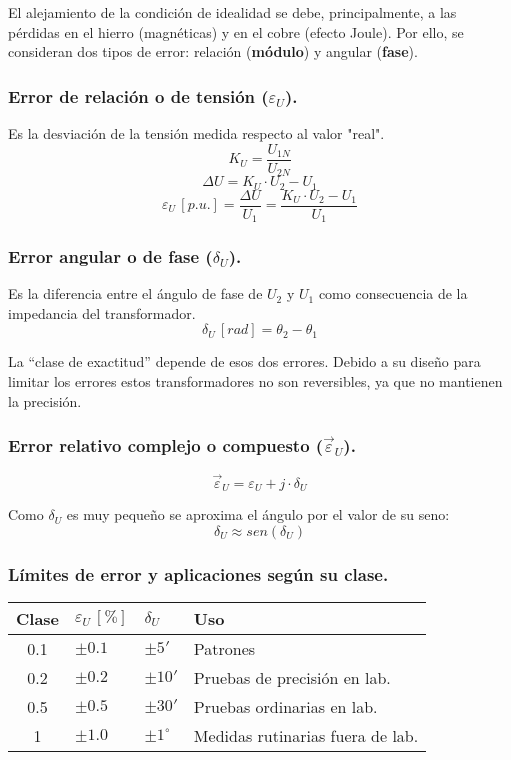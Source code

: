 				
				El alejamiento de la condición de idealidad se debe, principalmente, a las pérdidas en el hierro (magnéticas) y en el cobre (efecto Joule). Por ello, se consideran dos tipos de error: relación (\textbf{módulo}) y angular (\textbf{fase}).
				
				
				\subsubsection*{Error de relación o de tensión ($\varepsilon_U$).}
					Es la desviación de la tensión medida respecto al valor "real".
					\[K_U=\dfrac{U_{1N}}{U_{2N}}\]
					\[\Delta U = K_U\cdot U_2 - U_1\]
					\[\varepsilon_U\,[p.u.] = \dfrac{\Delta U}{U_1} = \dfrac{K_U\cdot U_2 - U_1}{U_1}\]
					
				\subsubsection*{Error angular o de fase ($\delta_U$).}
					Es la diferencia entre el ángulo de fase de $U_2$ y $U_1$ como consecuencia de la impedancia del transformador.
					\[\delta_U\,[rad] = \theta_2 - \theta_1\]
					
				
				La “clase de exactitud” depende de esos dos errores. Debido
				a su diseño para limitar los errores estos transformadores no
				son reversibles, ya que no mantienen la precisión.
				
				
				\subsubsection*{Error relativo complejo o compuesto ($\vec{\varepsilon}_U$).}
					\[\vec{\varepsilon}_U = \varepsilon_U + j\cdot \delta_U\]
					
					
					Como $\delta_U$ es muy pequeño se aproxima el ángulo por el
					valor de su seno:
					\[\delta_U \approx sen(\delta_U)\]
					
				
				\subsubsection*{Límites de error y aplicaciones según su clase.}
				\begin{table}[H]
					\begin{center}
						\begin{tabular}{clll}
							Clase & $\varepsilon_U\,[\%]$ & $\delta_U$ & Uso\\
							\hline
							0.1 & $\pm 0.1$ & $\pm 5'$ & Patrones\\
							0.2 & $\pm 0.2$ & $\pm 10'$ & Pruebas de precisión en lab.\\
							0.5 & $\pm 0.5$ & $\pm 30'$ & Pruebas ordinarias en lab.\\
							1   & $\pm 1.0$ & $\pm 1^\circ$ & Medidas rutinarias fuera de lab.\\
						\end{tabular}
					\end{center}
				\end{table}
					
